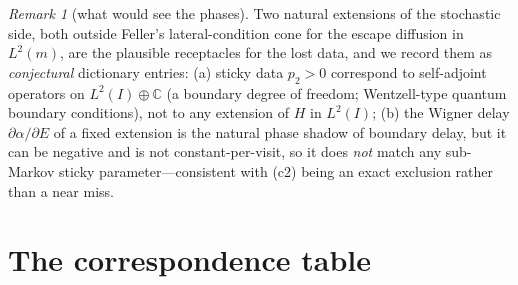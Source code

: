 \documentclass[11pt]{article}
\theoremstyle{remark}
\newtheorem{remark}[theorem]{Remark}
\newcommand{\C}{\mathbb{C}}
\begin{document}
\begin{remark}[what would see the phases]\label{rem:sticky}
Two natural extensions of the stochastic side, both outside Feller's
lateral-condition cone for the escape diffusion in $L^2(m)$, are the
plausible receptacles for the lost data, and we record them as
\emph{conjectural} dictionary entries: (a) sticky data $p_2>0$
correspond to self-adjoint operators on $L^2(I)\oplus\C$ (a boundary
degree of freedom; Wentzell-type quantum boundary conditions), not to
any extension of $H$ in $L^2(I)$; (b) the Wigner delay
$\partial\alpha/\partial E$ of a fixed extension is the natural phase
shadow of boundary delay, but it can be negative and is not
constant-per-visit, so it does \emph{not} match any sub-Markov sticky
parameter---consistent with (c2) being an exact exclusion rather than a
near miss.
\end{remark}

\section{The correspondence table}
\end{document}
